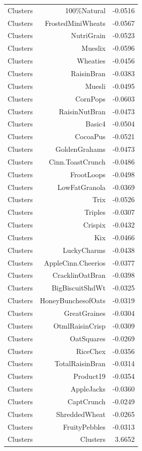 \begin{longtable}{@{}lrr@{}}
Clusters & 100\%Natural & -0.0516 \\
Clusters & FrostedMiniWheats & -0.0567 \\
Clusters & NutriGrain & -0.0523 \\
Clusters & Mueslix & -0.0596 \\
Clusters & Wheaties & -0.0456 \\
Clusters & RaisinBran & -0.0383 \\
Clusters & Muesli & -0.0495 \\
Clusters & CornPops & -0.0603 \\
Clusters & RaisinNutBran & -0.0473 \\
Clusters & Basic4 & -0.0504 \\
Clusters & CocoaPus & -0.0521 \\
Clusters & GoldenGrahams & -0.0473 \\
Clusters & Cinn.ToastCrunch & -0.0486 \\
Clusters & FrootLoops & -0.0498 \\
Clusters & LowFatGranola & -0.0369 \\
Clusters & Trix & -0.0526 \\
Clusters & Triples & -0.0307 \\
Clusters & Crispix & -0.0432 \\
Clusters & Kix & -0.0466 \\
Clusters & LuckyCharms & -0.0438 \\
Clusters & AppleCinn.Cheerios & -0.0377 \\
Clusters & CracklinOatBran & -0.0398 \\
Clusters & BigBiscuitShdWt & -0.0325 \\
Clusters & HoneyBunchesofOats & -0.0319 \\
Clusters & GreatGraines & -0.0304 \\
Clusters & OtmlRaisinCrisp & -0.0309 \\
Clusters & OatSquares & -0.0269 \\
Clusters & RiceChex & -0.0356 \\
Clusters & TotalRaisinBran & -0.0314 \\
Clusters & Product19 & -0.0354 \\
Clusters & AppleJacks & -0.0360 \\
Clusters & CaptCrunch & -0.0249 \\
Clusters & ShreddedWheat & -0.0265 \\
Clusters & FruityPebbles & -0.0313 \\
Clusters & Clusters & 3.6652 \\

\end{longtable}
